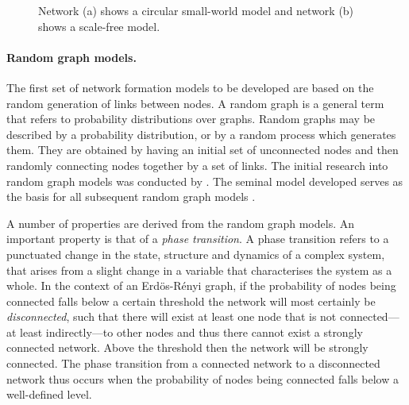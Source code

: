 \begin{figure}[t]
\begin{center}
\end{center}
\caption[Small-world and scale-free networks]{Network (a) shows a circular small-world model and network (b) shows a scale-free model.}
\end{figure}

\paragraph{Random graph models.}

The first set of network formation models to be developed are based on the random generation of links between nodes. A random graph is a general term that refers to probability distributions over graphs. Random graphs may be described by a probability distribution, or by a random process which generates them. They are obtained by having an initial set of unconnected nodes and then randomly connecting nodes together by a set of links. The initial research into random graph models was conducted by \citet{ErdosRenyi1959}. The seminal model developed serves as the basis for all subsequent random graph models \citep{Gilbert1959, Bollobas2001}.

A number of properties are derived from the random graph models. An important property is that of a \emph{phase transition}. A phase transition refers to a punctuated change in the state, structure and dynamics of a complex system, that arises from a slight change in a variable that characterises the system as a whole. In the context of an Erd\"{o}s-R\'{e}nyi graph, if the probability of nodes being connected falls below a certain threshold the network will most certainly be \emph{disconnected}, such that there will exist at least one node that is not connected---at least indirectly---to other nodes and thus there cannot exist a strongly connected network. Above the threshold then the network will be strongly connected. The phase transition from a connected network to a disconnected network thus occurs when the probability of nodes being connected falls below a well-defined level.

